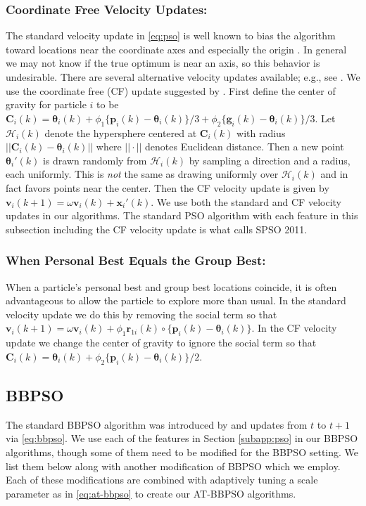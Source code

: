 \documentclass[cmbright]{staauth}
\numberwithin{table}{section}
\begin{document}
\subsubsection{Coordinate Free Velocity Updates:}
The standard velocity update in \eqref{eq:pso} is well known to bias the algorithm toward locations near the coordinate axes and especially the origin \citep{monson2005exposing,spears2010biases}. In general we may not know if the true optimum is near an axis, so this behavior is undesirable. There are several alternative velocity updates available; e.g., see \cite{monson2005exposing}. We use the coordinate free (CF) update suggested by \cite{clerc2011spso}. First define the center of gravity for particle $i$ to be $\bm{C}_i(k) = \bm{\theta}_i(k) + \phi_1\{\bm{p}_i(k) - \bm{\theta}_i(k)\}/3 + \phi_2\{\bm{g}_i(k) - \bm{\theta}_i(k)\}/3$. Let $\mathcal{H}_i(k)$ denote the hypersphere centered at $\bm{C}_i(k)$ with radius $||\bm{C}_i(k) - \bm{\theta}_i(k)||$ where $||\cdot||$ denotes Euclidean distance. Then a new point $\bm{\theta}_i'(k)$ is drawn randomly from $\mathcal{H}_i(k)$ by sampling a direction and a radius, each uniformly. This is \emph{not} the same as drawing uniformly over $\mathcal{H}_i(k)$ and in fact favors points near the center. Then the CF velocity update is given by $\bm{v}_i(k+1) = \omega \bm{v}_i(k) + \bm{x}_i'(k)$. We use both the standard and CF velocity updates in our algorithms. The standard PSO algorithm with each feature in this subsection including the CF velocity update is what \cite{clerc2011spso} calls SPSO 2011.

\subsubsection{When Personal Best Equals the Group Best:}
When a particle's personal best and group best locations coincide, it is often advantageous to allow the particle to explore more than usual. In the standard velocity update we do this by removing the social term so that $\bm{v}_i(k+1) = \omega \bm{v}_i(k) + \phi_1 \bm{r}_{1i}(k)\circ\{\bm{p}_i(k) - \bm{\theta}_i(k)\}$. In the CF velocity update we change the center of gravity to ignore the social term so that $\bm{C}_i(k) = \bm{\theta}_i(k) + \phi_2\{\bm{p}_i(k) - \bm{\theta}_i(k)\}/2$.

\subsection{BBPSO}\label{subapp:bbpso}
The standard BBPSO algorithm was introduced by \cite{kennedy2003bare} and updates from $t$ to $t+1$ via \eqref{eq:bbpso}. We use each of the features in Section \ref{subapp:pso} in our BBPSO algorithms, though some of them need to be modified for the BBPSO setting. We list them below along with another modification of BBPSO which we employ. Each of these modifications are combined with adaptively tuning a scale parameter as in  \eqref{eq:at-bbpso} to create our AT-BBPSO algorithms.
\end{document}
